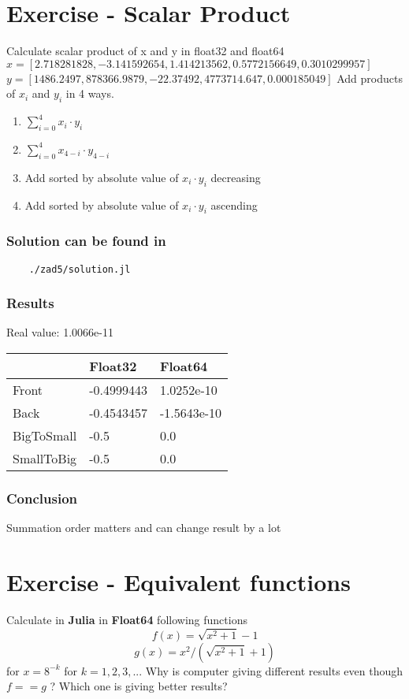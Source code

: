 \documentclass[12pt]{article}
\begin{document}
\section{Exercise - Scalar Product}
Calculate scalar product of x and y in float32 and float64\newline
$x = [2.718281828, -3.141592654, 1.414213562, 0.5772156649, 0.3010299957]$ \newline
$y = [1486.2497, 878366.9879, -22.37492, 4773714.647, 0.000185049]$ \newline
Add products of $x_i$ and $y_i$ in 4 ways.
\begin{enumerate}
    \item $\sum_{i=0}^{4}x_i \cdot y_i$
    \item $\sum_{i=0}^{4}x_{4-i} \cdot y_{4-i}$
    \item Add sorted by absolute value of $x_i \cdot y_i$ decreasing
    \item Add sorted by absolute value of $x_i \cdot y_i$ ascending
\end{enumerate}
\subsubsection*{Solution can be found in}
\begin{verbatim}
    ./zad5/solution.jl
\end{verbatim}
\subsubsection*{Results}
Real value:  1.0066e-11
\begin{table}[!ht]
    \centering
    \begin{tabular}{|l|l|l|}
    \hline
        ~ & Float32 & Float64 \\ \hline
        Front & -0.4999443 & 1.0252e-10 \\ \hline
        Back & -0.4543457 & -1.5643e-10 \\ \hline
        BigToSmall & -0.5 & 0.0 \\ \hline
        SmallToBig & -0.5 & 0.0 \\ \hline
    \end{tabular}
\end{table}
\subsubsection*{Conclusion}
Summation order matters and can change result by a lot
\section{Exercise - Equivalent functions}
Calculate in \textbf{Julia} in \textbf{Float64} following functions 
$$f(x) = \sqrt{x^2 + 1} - 1$$
$$g(x) = x^2 / (\sqrt{x^2 + 1} + 1)$$
for $x = 8^{-k}$ for $k=1,2,3,...$ \newline
Why is computer giving different results even though $f==g$ ?  \newline
Which one is giving better results?
\end{document}
